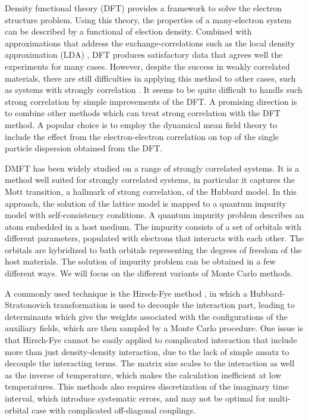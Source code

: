 Density functional theory (DFT)\cite{PhysRev.136.B864,PhysRev.140.A1133} 
provides a framework to solve the 
electron structure problem. Using this theory, the properties of a many-electron
system can be described by a functional of election density. Combined with 
approximations that address the exchange-correlations such as the local density 
approximation (LDA) \cite{lundqvist1983}, DFT produces satisfactory data that agrees well the 
experiments for many cases. However, despite the success in weakly correlated 
materials, there are still difficulties in applying this method to other 
cases, such as systems with strongly correlation \cite{0953-8984-9-35-010}. 
It seems to be quite
difficult to handle such strong correlation by simple improvements of the 
DFT. A promising direction is to combine other methods which can treat
strong correlation with the DFT method. A popular choice is to employ 
the dynamical mean field theory\citep{RevModPhys.68.13,PhysRevB.45.6479} 
to include the effect from the electron-electron
correlation on top of the single particle dispersion obtained from the DFT. 



DMFT has been widely studied on a range of strongly correlated systems. 
It is a method well suited for strongly correlated systems, in particular it 
captures the Mott transition, a hallmark of strong correlation, of the Hubbard 
model. In this approach, the solution of the lattice model is mapped to a 
quantum impurity model with self-consistency conditions. 
A quantum impurity problem describes an atom embedded in a host medium. 
The impurity consists of a set of orbitals with different parameters, populated
with electrons that interacts with each other. The orbitals are hybridized to 
bath orbitals representing the degrees of freedom of the host materials. 
The solution of impurity problem can be obtained in a few different ways. 
We will focus on the different variants of Monte Carlo methods.

A commonly used technique is the Hirsch-Fye method \cite{1986PhRvL..56.2521H}, in which a 
Hubbard-Stratonovich transformation is used to decouple the interaction part,
leading to determinants which give the weights associated with the 
configurations of the auxiliary fields, which are then sampled by a Monte Carlo 
procedure. One issue is that Hirsch-Fye cannot be easily applied to complicated
interaction that include more than just density-density interaction, due to the
lack of simple ansatz to decouple the interacting terms. 
The matrix size scales to the interaction as well as the inverse of 
temperature, which makes the calculation inefficient at low temperatures.
This methods also requires discretization of the imaginary time interval,
which introduce systematic errors, and may not be optimal for multi-orbital case 
with complicated off-diagonal couplings.

